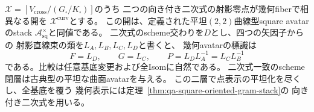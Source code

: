 \begin{theorem}[曲線型幾何avatarの全相対Isom比較]
\label{thm:qa-flat-curve-avatar-cross-equivalence}
$\mathcal X=[V_{\mathrm{cross}}/(G_\square/K_\square)]$のうち
二つの向き付き二次式の射影零点が幾何fiberで相異なる開を
$\mathcal X^{\mathrm{curv}}$とする。
この開は、定義された平坦$(2,2)$曲線型square avatarのstack
$\mathcal A_{\mathrm{sq}}^{\times}$と同値である。
二次式のscheme交わりを$D$とし、四つの矢因子からの
射影直線束の類を$L_A,L_B,L_C,L_D$と書くと、
幾何avatarの標識は
\[
 F=L_D,\qquad G=L_C,\qquad
 P=L_D L_A^{-1}=L_C L_B^{-1}
\]
である。比較は任意基底変更および全Isomに自然である。
二次式一致のscheme閉層は古典型の平坦な曲面avatarを与える。
この二層で点表示の平坦化を尽くし、全基底を覆う
幾何表示には定理~\ref{thm:qa-square-oriented-gram-stack}の
向き付き二次式を用いる。
\end{theorem}
